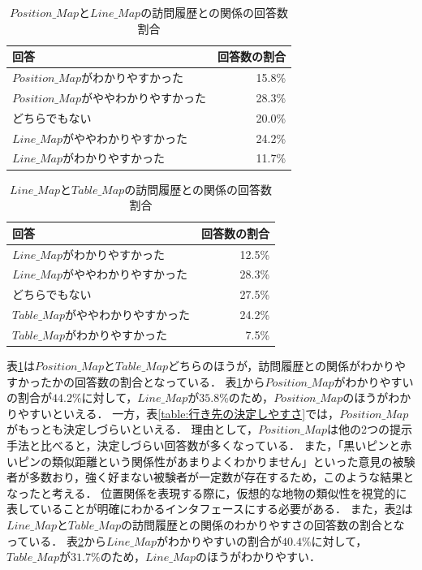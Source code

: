 \documentclass{deimj}
\begin{document}
\begin{table}[t]
    \caption{$Position\_Map$と$Line\_Map$の訪問履歴との関係の回答数割合}
    \label{table:PLの訪問履歴との関係}
    \centering
    \begin{tabular}{l|r}
    \hline
    回答    & 回答数の割合 \\
    \hline
    $Position\_Map$がわかりやすかった   & 15.8\% \\
    $Position\_Map$がややわかりやすかった & 28.3\% \\
    どちらでもない                  & 20.0\% \\
    $Line\_Map$がややわかりやすかった     & 24.2\% \\
    $Line\_Map$がわかりやすかった       & 11.7\% \\ \hline
    \end{tabular}
\end{table}
\begin{table}[t]
    \caption{$Line\_Map$と$Table\_Map$の訪問履歴との関係の回答数割合}
    \label{table:LTの訪問履歴との関係}
    \centering
    \begin{tabular}{l|r}
    \hline
    回答    & 回答数の割合 \\
    \hline
    $Line\_Map$がわかりやすかった    & 12.5\% \\
    $Line\_Map$がややわかりやすかった  & 28.3\% \\
    どちらでもない               & 27.5\% \\
    $Table\_Map$がややわかりやすかった & 24.2\% \\
    $Table\_Map$がわかりやすかった   & 7.5\%  \\ \hline
    \end{tabular}
\end{table}
表\ref{table:PLの訪問履歴との関係}は$Position\_Map$と$Table\_Map$どちらのほうが，訪問履歴との関係がわかりやすかったかの回答数の割合となっている．
表\ref{table:PLの訪問履歴との関係}から$Position\_Map$がわかりやすいの割合が$44.2\%$に対して，$Line\_Map$が$35.8\%$のため，$Position\_Map$のほうがわかりやすいといえる．
一方，表\ref{table:行き先の決定しやすさ}では，$Position\_Map$がもっとも決定しづらいといえる．
理由として，$Position\_Map$は他の2つの提示手法と比べると，決定しづらい回答数が多くなっている．
また，「黒いピンと赤いピンの類似距離という関係性があまりよくわかりません」といった意見の被験者が多数おり，強く好まない被験者が一定数が存在するため，このような結果となったと考える．
位置関係を表現する際に，仮想的な地物の類似性を視覚的に表していることが明確にわかるインタフェースにする必要がある．
また，表\ref{table:LTの訪問履歴との関係}は$Line\_Map$と$Table\_Map$の訪問履歴との関係のわかりやすさの回答数の割合となっている．
表\ref{table:LTの訪問履歴との関係}から$Line\_Map$がわかりやすいの割合が$40.4\%$に対して，$Table\_Map$が$31.7\%$のため，$Line\_Map$のほうがわかりやすい．
\end{document}
